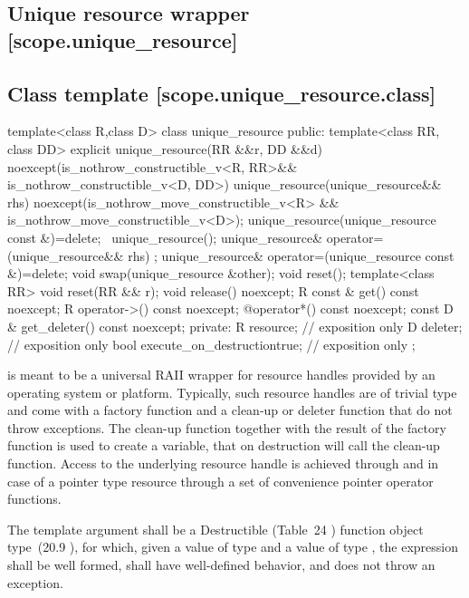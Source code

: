 \documentclass[ebook,11pt,article]{memoir}
\begin{document}
\subsection{Unique resource wrapper [scope.unique_resource]}

\subsection {Class template  [scope.unique_resource.class]}

\begin{codeblock}
template<class R,class D>
class unique_resource {
public:
  template<class RR, class DD>
  explicit unique_resource(RR &&r, DD &&d)
    noexcept(is_nothrow_constructible_v<R, RR>&&
             is_nothrow_constructible_v<D, DD>)
  unique_resource(unique_resource&& rhs)
    noexcept(is_nothrow_move_constructible_v<R> &&
             is_nothrow_move_constructible_v<D>);
  unique_resource(unique_resource const &)=delete; 
  ~unique_resource();
  unique_resource& operator=(unique_resource&& rhs) ;
  unique_resource& operator=(unique_resource const &)=delete;
  void swap(unique_resource &other);
  void reset();
  template<class RR>
  void reset(RR && r);
  void release() noexcept;
  R const & get() const noexcept;
  R operator->() const noexcept;
  @\seebelow@ operator*() const noexcept;
  const D & get_deleter() const noexcept;
private:
  R resource; // exposition only
  D deleter; // exposition only
  bool execute_on_destruction{true}; // exposition only
};
\end{codeblock}

\pnum
\enternote
{} is meant to be a universal RAII wrapper for resource handles provided by an operating system or platform.
Typically, such resource handles are of trivial type and come with a factory function and a clean-up or deleter function that do not throw exceptions.
The clean-up function together with the result of the factory function is used to create a  variable, that on destruction will call the clean-up function. Access to the underlying resource handle is achieved through  and in case of a pointer type resource through a set of convenience pointer operator functions.
\exitnote


\pnum 
The template argument
 shall be a 
Destructible 
(Table~24
) function object type~(20.9
), 
for which, given
a value  of type  and a value
 of type , the expression
 shall be well formed, shall have well-defined behavior, and does not throw an exception.
\end{document}
